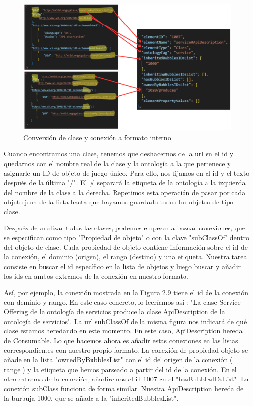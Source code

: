 \begin{figure}[ht]
   \begin{center}
      \includegraphics[width=0.9\linewidth]{chapter2/figures/parser.png}
   \end{center}
   \caption[Conversión de clase y conexión a formato interno]
   {\footnotesize Conversión de clase y conexión a formato interno}
   \label{fig:mufigure13}
\end{figure}

Cuando encontramos una clase, tenemos que deshacernos de la url en el id y quedarnos con el nombre real de la clase y la ontología a la que pertenece y asignarle un ID de objeto de juego único.
Para ello, nos fijamos en el id y el texto después de la última "/". El \# separará la etiqueta de la ontología a la izquierda del nombre de la clase a la derecha.
Repetimos esta operación de pasar por cada objeto json de la lista hasta que hayamos guardado todos los objetos de tipo clase.

Después de analizar todas las clases, podemos empezar a buscar conexiones, que se especifican como tipo "Propiedad de objeto" o con la clave "subClassOf" dentro del objeto de clase. Cada propiedad de objeto contiene información sobre el id de la conexión, el dominio (origen), el rango (destino) y una etiqueta. Nuestra tarea consiste en buscar el id específico en la lista de objetos y luego buscar y añadir los ids en ambos extremos de la conexión en nuestro formato.

Así, por ejemplo, la conexión mostrada en la Figura 2.9 tiene el id de la conexión con dominio y rango. En este caso concreto, lo leeríamos así : "La clase Service Offering de la ontología de servicios produce la clase ApiDescription de la ontología de servicios". 
La url subClassOf de la misma figura nos indicará de qué clase estamos heredando en este momento. En este caso, ApiDescription hereda de Consumable. Lo que hacemos ahora es añadir estas conexiones en las listas correspondientes con nuestro propio formato. La conexión de propiedad objeto se añade en la lista "ownedByBubblesList" con el id del origen de la conexión ( range ) y la etiqueta que hemos parseado a partir del id de la conexión. En el otro extremo de la conexión, añadiremos el id 1007 en el "hasBubblesIDsList". La conexión subClass
funciona de forma similar. Nuestra ApiDescription hereda de la burbuja 1000, que se añade a la "inheritedBubblesList".

